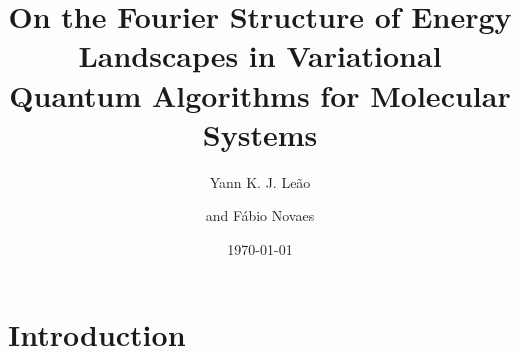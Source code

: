 \documentclass[12pt]{article}
\title{On the Fourier Structure of Energy Landscapes in Variational Quantum Algorithms for Molecular Systems}
\author[a]{Yann K. J. Leão}
\affiliation[a,b]{Federal Rural University of Pernambuco}
\author[b]{and Fábio Novaes}
\date{\today}
\begin{document}
\maketitle

\section{Introduction}




\end{document}
